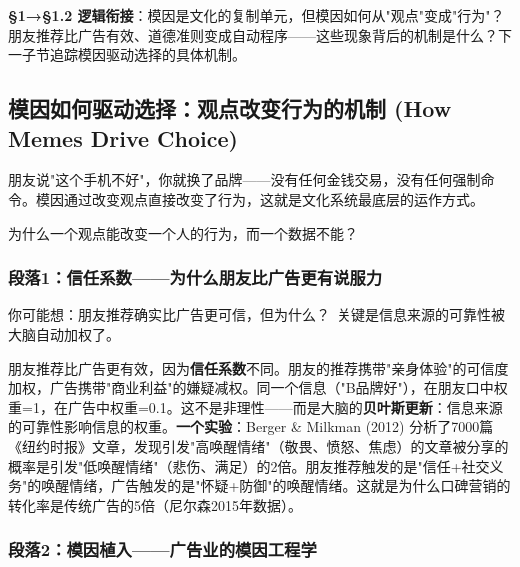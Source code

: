 \documentclass[../main.tex]{subfiles}
\begin{document}
	\textbf{§1→§1.2 逻辑衔接}：模因是文化的复制单元，但模因如何从"观点"变成"行为"？朋友推荐比广告有效、道德准则变成自动程序——这些现象背后的机制是什么？下一子节追踪模因驱动选择的具体机制。

\subsection{模因如何驱动选择：观点改变行为的机制 (How Memes Drive Choice)}

\begin{motivation}

	朋友说"这个手机不好"，你就换了品牌——没有任何金钱交易，没有任何强制命令。模因通过改变观点直接改变了行为，这就是文化系统最底层的运作方式。

\end{motivation}

\begin{questionbox}

	为什么一个观点能改变一个人的行为，而一个数据不能？

\end{questionbox}

\subsubsection*{段落1：信任系数——为什么朋友比广告更有说服力}

\begin{tcolorbox}[colback=yellow!5, title=\textit{读者行为预测}]

	你可能想：朋友推荐确实比广告更可信，但为什么？\ 关键是信息来源的可靠性被大脑自动加权了。

\end{tcolorbox}

朋友推荐比广告更有效，因为\textbf{信任系数}不同。朋友的推荐携带"亲身体验"的可信度加权，广告携带"商业利益"的嫌疑减权。同一个信息（"B品牌好"），在朋友口中权重=1，在广告中权重=0.1。这不是非理性——而是大脑的\textbf{贝叶斯更新}：信息来源的可靠性影响信息的权重。\textbf{一个实验}：Berger \& Milkman (2012) 分析了7000篇《纽约时报》文章，发现引发"高唤醒情绪"（敬畏、愤怒、焦虑）的文章被分享的概率是引发"低唤醒情绪"（悲伤、满足）的2倍。朋友推荐触发的是"信任+社交义务"的唤醒情绪，广告触发的是"怀疑+防御"的唤醒情绪。这就是为什么口碑营销的转化率是传统广告的5倍（尼尔森2015年数据）。

\subsubsection*{段落2：模因植入——广告业的模因工程学}
\end{document}
